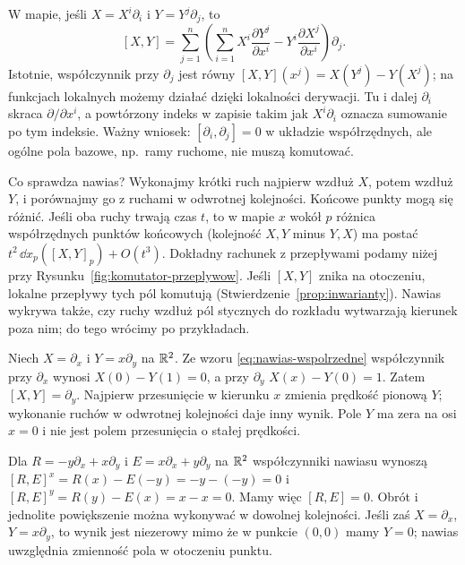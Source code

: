 W mapie, jeśli $X=X^i\partial_i$ i $Y=Y^j\partial_j$, to
\begin{equation}\label{eq:nawias-wspolrzedne}
 [X,Y]=\sum_{j=1}^{n}\left(\sum_{i=1}^{n}
 X^i\frac{\partial Y^j}{\partial x^i}-
 Y^i\frac{\partial X^j}{\partial x^i}\right)\partial_j.
\end{equation}
Istotnie, współczynnik przy $\partial_j$ jest równy
$[X,Y](x^j)=X(Y^j)-Y(X^j)$; na funkcjach lokalnych możemy
działać dzięki lokalności derywacji. Tu i dalej $\partial_i$
skraca $\partial/\partial x^i$, a powtórzony indeks w zapisie
takim jak $X^i\partial_i$ oznacza sumowanie po tym indeksie.
Ważny wniosek: $[\partial_i,\partial_j]=0$ w układzie współrzędnych,
ale ogólne pola bazowe, np.\ ramy ruchome, nie muszą komutować.

Co sprawdza nawias? Wykonajmy krótki ruch najpierw wzdłuż $X$,
potem wzdłuż $Y$, i porównajmy go z ruchami w odwrotnej kolejności.
Końcowe punkty mogą się różnić. Jeśli oba ruchy trwają czas $t$,
to w mapie $x$ wokół $p$ różnica współrzędnych punktów końcowych
(kolejność $X,Y$ minus $Y,X$) ma postać
$t^2\,\dd x_p([X,Y]_p)+O(t^3)$. Dokładny rachunek z przepływami podamy
niżej przy Rysunku~\ref{fig:komutator-przeplywow}.
Jeśli $[X,Y]$ znika na otoczeniu, lokalne przepływy tych pól
komutują (Stwierdzenie~\ref{prop:inwarianty}).
Nawias wykrywa także, czy ruchy wzdłuż pól stycznych do rozkładu
wytwarzają kierunek poza nim; do tego wrócimy po przykładach.

\begin{przyklad}\label{prz:scinanie}
Niech $X=\partial_x$ i $Y=x\partial_y$ na $\mathbb{R}^2$.
Ze wzoru \eqref{eq:nawias-wspolrzedne} współczynnik przy
$\partial_x$ wynosi $X(0)-Y(1)=0$, a przy $\partial_y$
$X(x)-Y(0)=1$. Zatem $[X,Y]=\partial_y$.
Najpierw przesunięcie w kierunku $x$
zmienia prędkość pionową $Y$; wykonanie ruchów w odwrotnej kolejności
daje inny wynik. Pole $Y$ ma zera na osi $x=0$ i nie jest polem
przesunięcia o stałej prędkości.
\end{przyklad}

\begin{przyklad}
Dla $R=-y\partial_x+x\partial_y$ i $E=x\partial_x+y\partial_y$
na $\mathbb{R}^2$ współczynniki nawiasu wynoszą
$[R,E]^x=R(x)-E(-y)=-y-(-y)=0$ i
$[R,E]^y=R(y)-E(x)=x-x=0$.
Mamy więc $[R,E]=0$. Obrót i jednolite powiększenie
można wykonywać w dowolnej kolejności. Jeśli zaś
$X=\partial_x$, $Y=x\partial_y$, to wynik jest niezerowy
mimo że w punkcie $(0,0)$ mamy $Y=0$; nawias uwzględnia zmienność
pola w otoczeniu punktu.
\end{przyklad}



